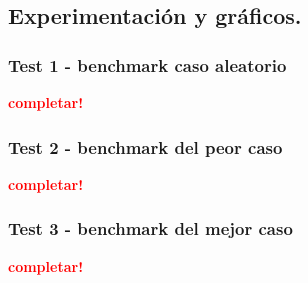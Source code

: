 \subsection{Experimentación y gráficos.}

\vspace*{0.3cm}

\subsubsection{Test 1 - benchmark caso aleatorio}

\textcolor{red}{\textbf{completar!}}


\newpage
\subsubsection{Test 2 - benchmark del peor caso}

\textcolor{red}{\textbf{completar!}}


\newpage
\subsubsection{Test 3 - benchmark del mejor caso}

\textcolor{red}{\textbf{completar!}}
